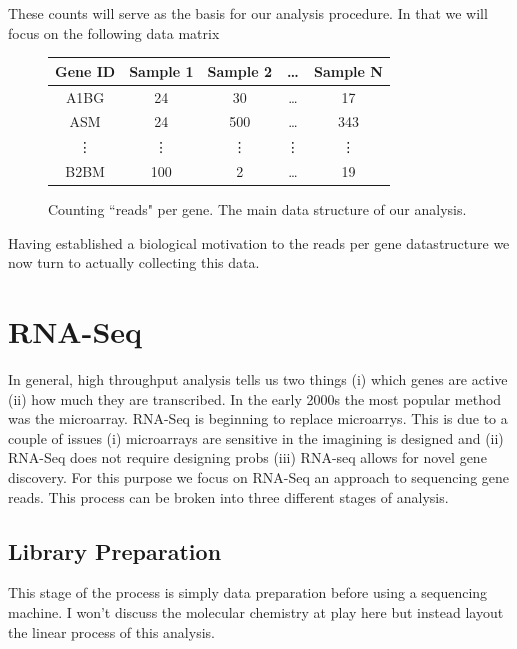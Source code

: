 \documentclass[11pt]{article}
\begin{document}
These counts will serve as the basis for our analysis procedure. In that we will focus on the following data matrix 
\begin{figure}[h!]
\centering
	\begin{tabular}{c|c|c|c|c}
		Gene ID & Sample 1 & Sample 2 & \dots & Sample N\\
		\hline
		A1BG & 24 & 30 & \dots & 17\\
		ASM & 24 & 500 & \dots & 343\\
		\vdots & \vdots & \vdots & \vdots & \vdots\\ 
		B2BM & 100 & 2 & \dots & 19
	\end{tabular}
	\caption{Counting ``reads" per gene. The main data structure of our analysis.}
\end{figure}
Having established a biological motivation to the reads per gene datastructure we now turn to actually collecting this data. 


\section{RNA-Seq}

In general, high throughput analysis tells us two things (i) which genes are active (ii) how much they are transcribed. In the early 2000s the most popular method was the microarray. RNA-Seq is beginning to replace microarrys. This is due to a couple of issues (i) microarrays are sensitive in the imagining is designed and (ii) RNA-Seq does not require designing probs (iii) RNA-seq allows for novel gene discovery. For this purpose we focus on RNA-Seq an approach to sequencing gene reads. This process can be broken into three different stages of analysis. 

\subsection{Library Preparation}
This stage of the process is simply data preparation before using a sequencing machine. I won't discuss the molecular chemistry at play here but instead layout the linear process of this analysis.
\end{document}
